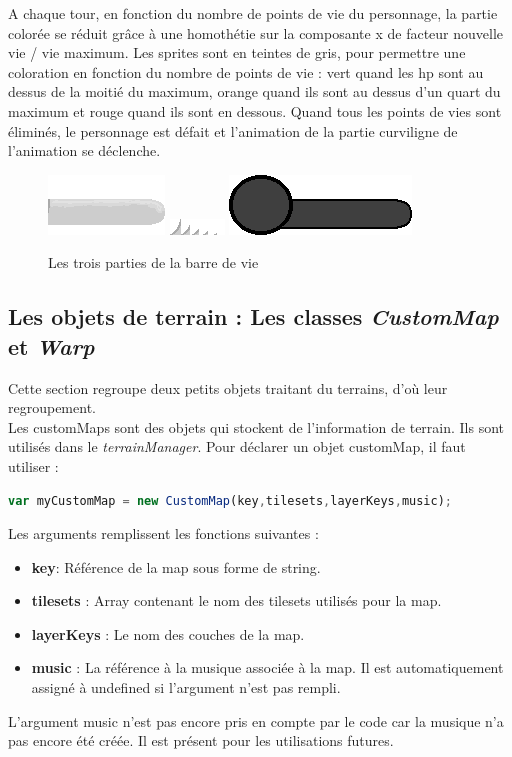\documentclass[11pt]{article}
\begin{document}
A chaque tour, en fonction du nombre de points de vie du personnage, la partie colorée se réduit grâce à une homothétie sur la composante x de facteur nouvelle vie / vie maximum.  Les sprites sont en teintes de gris, pour permettre une coloration en fonction du nombre de points de vie : vert quand les hp sont au dessus de la moitié du maximum, orange quand ils sont au dessus d'un quart du maximum et rouge quand ils sont en dessous. Quand tous les points de vies sont éliminés, le personnage est défait et l'animation de la partie curviligne de l'animation se déclenche.

\begin{figure}[H]
\includegraphics{health}
\includegraphics{healthP2}
\includegraphics{healthBar}
\caption{Les trois parties de la barre de vie}
\end{figure}
\subsection{Les objets de terrain : Les classes \textit{CustomMap} et \textit{Warp}}
Cette section regroupe deux petits objets traitant du terrains, d'où leur regroupement.\\

Les customMaps sont des objets qui stockent de l'information de terrain. Ils sont utilisés dans le \textit{terrainManager}. Pour déclarer un objet customMap, il faut utiliser : 
\begin{lstlisting}[language=JavaScript]
var myCustomMap = new CustomMap(key,tilesets,layerKeys,music);
\end{lstlisting} 

Les arguments remplissent les fonctions suivantes : 
\begin{itemize}
\item \textbf{key}: Référence de la map sous forme de string.
\item \textbf{tilesets} : Array contenant le nom des tilesets utilisés pour la map.
\item \textbf{layerKeys} : Le nom des couches de la map.
\item \textbf{music} : La référence à la musique associée à la map. Il est automatiquement assigné à undefined si l'argument n'est pas rempli.
\end{itemize}
L'argument music n'est pas encore pris en compte par le code car la musique n'a pas encore été créée. Il est présent pour les utilisations futures. \\
\end{document}
